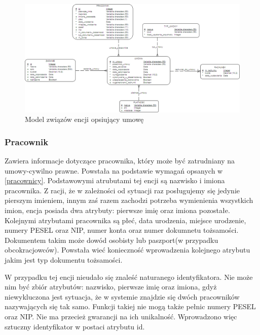 \begin{figure}[]
    \begin{center}
	\includegraphics[scale=.8,angle=-90]{img/logiczny3.png}
	\caption{Model związów encji opsiujący umowę}
	\label{logiczny3}
    \end{center}
\end{figure}

\subsubsection{Pracownik}
Zawiera informacje dotyczące pracownika, który może być zatrudniany na umowy-cywilno prawne. Powstała na podstawie wymagań opsanych w \ref{pracownicy}. Podstawowymi atrubutami tej encji są nazwisko i imiona pracownika. Z racji, że w zależności od sytuacji raz posługujemy się jedynie pierszym imieniem, innym zaś razem zachodzi potrzeba wymienienia wszystkich imion, encja posiada dwa atrybuty: pierwsze imię oraz imiona pozostałe. Kolejnymi atrybutami pracownika są płeć, data urodzenia, miejsce urodzenie, numery PESEL oraz NIP, numer konta oraz numer dokumnetu tożsamości. Dokumentem takim może dowód osobisty lub paszport(w przypadku obcokracjowców). Powstała wieć konieczność wprowadzenia kolejnego atrybutu jakim jest typ dokumentu tożsamości.

W przypadku tej encji nieudało się znaleść naturanego identyfikatora. Nie może nim być zbiór atrybutów: nazwisko, pierwsze imię oraz imiona, gdyż niewykluczona jest sytuacja, że w systemie znajdzie się dwóch pracowników nazywających się tak samo. Funkcji takiej nie mogą także pełnic numery PESEL oraz NIP. Nie ma przecież gwarancji na ich unikalność. Wprowadzono więc sztuczny identyfikator w postaci atrybutu id.

